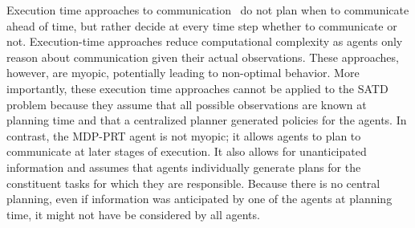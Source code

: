 Execution time approaches to communication~\cite{xuan2001communication,oliehoek2007dec,emery2005game,roth2005reasoning,roth2006communicate,wu2009multi} do not plan when to communicate ahead of time, but rather decide at every time step whether to communicate or not. Execution-time approaches reduce computational complexity as agents only reason about communication given their actual observations. These approaches, however, are myopic, potentially leading to non-optimal behavior. More importantly, these execution time approaches cannot be applied to  the SATD problem because they assume that all possible observations are known at planning time and that a centralized planner generated policies for the agents. In contrast, the MDP-PRT agent is not myopic; it allows agents to plan to communicate at later stages of execution. It also allows for unanticipated information and assumes that agents individually generate plans for the constituent tasks for which they are responsible. Because there is no central planning, even if information was anticipated by one of the agents at planning time, it might not have be considered by all agents.




